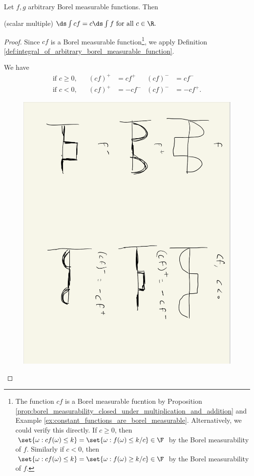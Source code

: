 \documentclass{article} %
\begin{document}

\begin{proposition}
Let $f,g$ arbitrary Borel measurable functions. Then
\begin{alphabate}
\item (scalar multiple) $\ds\int cf = c \ds\int f \text{ for all } c \in \R.$ 	
\end{alphabate}
\label{prop:properties_of_integrals_of_arbitrary_borel_measurable_functions}
\end{proposition}

\begin{proof}
Since $cf$ is a Borel measurable function\footnote{The function $cf$ is a Borel measurable fucntion by Proposition \ref{prop:borel_measurability_closed_under_multiplication_and_addition} and Example \ref{ex:constant_functions_are_borel_measurable}.  Alternatively, we could verify this directly.  If $c \geq 0$, then $\set{\omega : c f(\omega) \leq k} = \set{\omega : f(\omega) \leq k/c} \in \F$ by the Borel measurability of $f$.  Similarly if  $c < 0$, then $\set{\omega : c f(\omega) \leq k} = \set{\omega : f(\omega) \geq k/c} \in \F$ by the Borel measurability of $f$.}, we apply Definition \ref{def:integral_of_arbitrary_borel_measurable_function}.

We have 
\begin{subequations}
\begin{align}
\text{if $c \geq 0$}, && (cf)^+ &= cf^+  & (cf)^- &= cf^-   \label{eqn:decomposing_scalar_multiple_of_borel_measurable_function_into_two_nonnegative_functions_when_scalar_multiple_is_nonnegative} \\
\text{if $c < 0$}, && (cf)^+ &= -cf^-  & (cf)^- &= -cf^+. \label{eqn:decomposing_scalar_multiple_of_borel_measurable_function_into_two_nonnegative_functions_when_scalar_multiple_is_negative} 
\end{align}
\end{subequations}

\begin{figure}
\centering
\includegraphics[width=.5\textwidth, angle=90]{images/decomposing_scalar_multiple_of_borel_measurable_function_into_two_nonnegative_functions_when_scalar_multiple_is_negative}	
\end{figure}



\end{proof}
\end{document}
